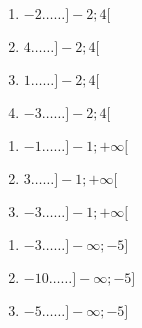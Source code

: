 \documentclass[a4paper,dvipsnames]{article}
\begin{document}
\begin{multicols}{4}
  \begin{enumerate}
    \item [] $-2\hdots\hdots]-2;4[$ \columnbreak
    \item [] $4\hdots\hdots]-2;4[$\columnbreak
    \item [] $1\hdots\hdots]-2;4[$\columnbreak
    \item [] $-3\hdots\hdots]-2;4[$
  \end{enumerate}
\end{multicols}

\begin{multicols}{4}
  \begin{enumerate}
    \item [] $-1\hdots\hdots]-1;+\infty[$ \columnbreak
    \item [] $3\hdots\hdots]-1;+\infty[$ \columnbreak
    \item [] $-3\hdots\hdots]-1;+\infty[$ 
  \end{enumerate}
\end{multicols}

\begin{multicols}{4}
  \begin{enumerate}
    \item [] $-3\hdots\hdots]-\infty;-5]$\columnbreak
    \item [] $-10\hdots\hdots]-\infty;-5]$\columnbreak
    \item [] $-5\hdots\hdots]-\infty;-5]$
  \end{enumerate}
\end{multicols}

\bigskip
\end{document}
